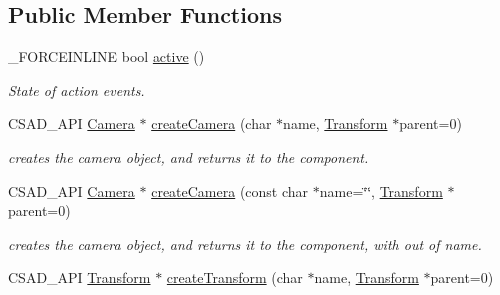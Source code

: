 \subsection*{Public Member Functions}
\begin{DoxyCompactItemize}
\item 
\hypertarget{classcsad_1_1_scene_a10eb8937e7d0ad94681ed9eaa2b8d16c}{\-\_\-\-F\-O\-R\-C\-E\-I\-N\-L\-I\-N\-E bool \hyperlink{classcsad_1_1_scene_a10eb8937e7d0ad94681ed9eaa2b8d16c}{active} ()}\label{classcsad_1_1_scene_a10eb8937e7d0ad94681ed9eaa2b8d16c}

\begin{DoxyCompactList}\small\item\em State of action events. \end{DoxyCompactList}\item 
\hypertarget{classcsad_1_1_scene_aa9b6f21487e82e009d8dd387f238607a}{C\-S\-A\-D\-\_\-\-A\-P\-I \hyperlink{classcsad_1_1_camera}{Camera} $\ast$ \hyperlink{classcsad_1_1_scene_aa9b6f21487e82e009d8dd387f238607a}{create\-Camera} (char $\ast$name, \hyperlink{classcsad_1_1_transform}{Transform} $\ast$parent=0)}\label{classcsad_1_1_scene_aa9b6f21487e82e009d8dd387f238607a}

\begin{DoxyCompactList}\small\item\em creates the camera object, and returns it to the component. \end{DoxyCompactList}\item 
\hypertarget{classcsad_1_1_scene_a904bf3332f4aea7dd4fd62b446309c9a}{C\-S\-A\-D\-\_\-\-A\-P\-I \hyperlink{classcsad_1_1_camera}{Camera} $\ast$ \hyperlink{classcsad_1_1_scene_a904bf3332f4aea7dd4fd62b446309c9a}{create\-Camera} (const char $\ast$name=\char`\"{}\char`\"{}, \hyperlink{classcsad_1_1_transform}{Transform} $\ast$parent=0)}\label{classcsad_1_1_scene_a904bf3332f4aea7dd4fd62b446309c9a}

\begin{DoxyCompactList}\small\item\em creates the camera object, and returns it to the component, with out of name. \end{DoxyCompactList}\item 
\hypertarget{classcsad_1_1_scene_ae1c3f28c9d411628e3b619d0aa04e7be}{C\-S\-A\-D\-\_\-\-A\-P\-I \hyperlink{classcsad_1_1_transform}{Transform} $\ast$ \hyperlink{classcsad_1_1_scene_ae1c3f28c9d411628e3b619d0aa04e7be}{create\-Transform} (char $\ast$name, \hyperlink{classcsad_1_1_transform}{Transform} $\ast$parent=0)}\label{classcsad_1_1_scene_ae1c3f28c9d411628e3b619d0aa04e7be}


\end{DoxyCompactItemize}
